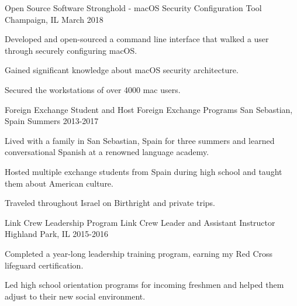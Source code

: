 

\begin{cventries}
\cventry
{Open Source Software} %
{Stronghold - macOS Security Configuration Tool} %
{Champaign, IL} %
{March 2018} %
{
	\begin{cvitems} %
		\item {Developed and open-sourced a command line interface that walked a user through securely configuring macOS.}
		\item{Gained significant knowledge about macOS security architecture.} 
		\item {Secured the workstations of over 4000 mac users.}
	\end{cvitems}
}
\cventry
{Foreign Exchange Student and Host} %
{Foreign Exchange Programs} %
{San Sebastian, Spain} %
{Summers 2013-2017} %
{
	\begin{cvitems} %
		\item {Lived with a family in San Sebastian, Spain for three summers and learned conversational Spanish at a renowned language academy.}
		\item {Hosted multiple exchange students from Spain during high school and taught them about American culture.}
		\item {Traveled throughout Israel on Birthright and private trips.}
	\end{cvitems}
}
\cventry
{Link Crew Leadership Program} %
{Link Crew Leader and Assistant Instructor} %
{Highland Park, IL} %
{2015-2016} %
{
   \begin{cvitems} %
        \item {Completed a year-long leadership training program, earning my Red Cross lifeguard certification.}
        \item {Led high school orientation programs for incoming freshmen and helped them adjust to their new social environment.}
   \end{cvitems}
} 
\end{cventries}
